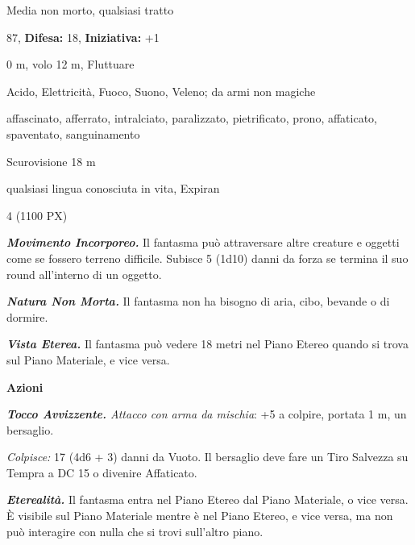 \begin{multicols}{2}
{%

\noindent
\begin{description}[noitemsep, topsep=0pt, parsep=0pt, partopsep=0pt, leftmargin=0cm, labelwidth=2.2cm]
	\item[\textbf{Taglia/Tipo:}] Media non morto, qualsiasi tratto
	\item[\textbf{Caratt.:}] 
	\item[\textbf{Punti Ferita:}] 87,  \textbf{Difesa:} 18,  \textbf{Iniziativa:} +1
	\item[\textbf{Movimento:}] 0 m, volo 12 m, Fluttuare
	\item[\textbf{Tiri Salvez.:}] 
	\item[\textbf{Res. Danni:}] Acido, Elettricità, Fuoco, Suono, Veleno; da armi non magiche
	\item[\textbf{Immunità:}] affascinato, afferrato, intralciato, paralizzato, pietrificato, prono, affaticato, spaventato, sanguinamento
	\item[\textbf{Sensi:}] Scurovisione 18 m
	\item[\textbf{Linguaggi:}] qualsiasi lingua conosciuta in vita, Expiran
	\item[\textbf{Sfida:}] 4 (1100 PX)\smallskip
\end{description}

\emph{\textbf{Movimento Incorporeo.}} Il fantasma può attraversare altre creature e oggetti come se fossero terreno difficile. Subisce 5 (1d10) danni da forza se termina il suo round all'interno di un oggetto.

\emph{\textbf{Natura Non Morta.}} Il fantasma non ha bisogno di aria, cibo, bevande o di dormire.

\emph{\textbf{Vista Eterea.}} Il fantasma può vedere 18 metri nel Piano Etereo quando si trova sul Piano Materiale, e vice versa.

\textbf{Azioni}

\emph{\textbf{Tocco Avvizzente.} Attacco con arma da mischia}: +5 a colpire, portata 1 m, un bersaglio.

\emph{Colpisce:} 17 (4d6 + 3) danni da Vuoto. Il bersaglio deve fare un Tiro Salvezza su Tempra a DC 15 o divenire Affaticato.

\emph{\textbf{Eterealità.}} Il fantasma entra nel Piano Etereo dal Piano Materiale, o vice versa. È visibile sul Piano Materiale mentre è nel Piano Etereo, e vice versa, ma non può interagire con nulla che si trovi sull'altro piano.

}
\end{multicols}
